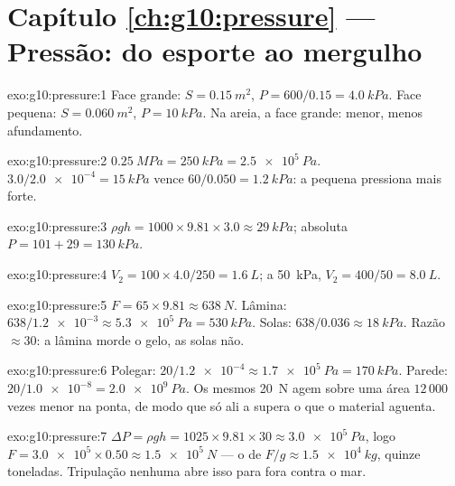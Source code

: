 \section*{Capítulo \ref{ch:g10:pressure} --- Pressão: do esporte ao mergulho}

\begin{solution}{exo:g10:pressure:1}
Face grande: $S = \qty{0.15}{m^2}$, $P = 600/0.15 = \qty{4.0}{kPa}$.
Face pequena: $S = \qty{0.060}{m^2}$, $P = \qty{10}{kPa}$. Na areia, a
face grande:  menor, menos afundamento.
\end{solution}

\begin{solution}{exo:g10:pressure:2}
$\qty{0.25}{MPa} = \qty{250}{kPa} = \qty{2.5e5}{Pa}$.
$3.0/\num{2.0e-4} = \qty{15}{kPa}$ vence
$60/0.050 = \qty{1.2}{kPa}$: a  pequena pressiona mais forte.
\end{solution}

\begin{solution}{exo:g10:pressure:3}
$\rho g h = 1000 \times 9.81 \times 3.0 \approx \qty{29}{kPa}$; absoluta
$P = 101 + 29 = \qty{130}{kPa}$.
\end{solution}

\begin{solution}{exo:g10:pressure:4}
$V_2 = 100 \times 4.0 / 250 = \qty{1.6}{L}$; a \qty{50}{kPa},
$V_2 = 400/50 = \qty{8.0}{L}$.
\end{solution}

\begin{solution}{exo:g10:pressure:5}
$F = 65 \times 9.81 \approx \qty{638}{N}$. Lâmina:
$638/\num{1.2e-3} \approx \qty{5.3e5}{Pa} = \qty{530}{kPa}$. Solas:
$638/0.036 \approx \qty{18}{kPa}$. Razão $\approx 30$: a lâmina morde o
gelo, as solas não.
\end{solution}

\begin{solution}{exo:g10:pressure:6}
Polegar: $20/\num{1.2e-4} \approx \qty{1.7e5}{Pa} = \qty{170}{kPa}$.
Parede: $20/\num{1.0e-8} = \qty{2.0e9}{Pa}$. Os mesmos \qty{20}{N} agem
sobre uma área $12\,000$ vezes menor na ponta, de modo que só ali a
 supera o que o material aguenta.
\end{solution}

\begin{solution}{exo:g10:pressure:7}
$\Delta P = \rho g h = 1025 \times 9.81 \times 30 \approx
\qty{3.0e5}{Pa}$, logo
$F = \num{3.0e5} \times 0.50 \approx \qty{1.5e5}{N}$ --- o  de
$F/g \approx \qty{1.5e4}{kg}$, quinze toneladas. Tripulação nenhuma abre
isso para fora contra o mar.
\end{solution}

